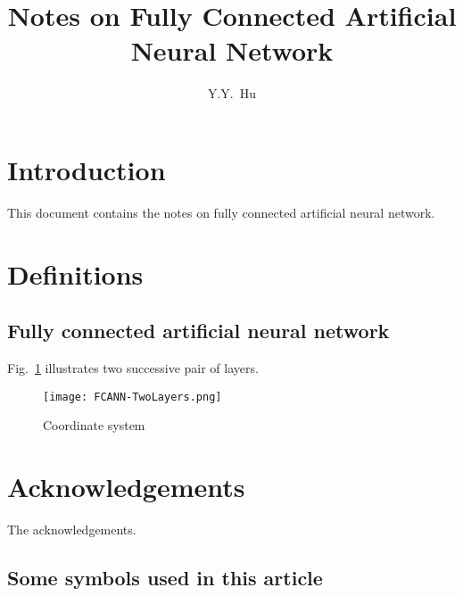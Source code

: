 \documentclass{article}
\title{Notes on Fully Connected Artificial Neural Network}
\author{Y.Y.~Hu}
\begin{document}

\maketitle

\section{Introduction}

This document contains the notes on fully connected artificial neural network.

\section{Definitions}
\subsection{Fully connected artificial neural network}
Fig.~\ref{fig:Coordinates} illustrates two successive pair of layers.

\begin{figure}[!htb]
	\centering
	\texttt{[image: FCANN-TwoLayers.png]}
	\caption{Coordinate system}
	\label{fig:Coordinates}
\end{figure}

\section*{Acknowledgements}
The acknowledgements.




\begin{appendices}

\section{Some symbols used in this article}

\end{appendices}
\end{document}
